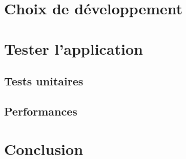 \documentclass[11pt]{article} %
\begin{document}
\section{Choix de développement}

\section{Tester l'application}
\subsection{Tests unitaires}
\subsection{Performances}

\section{Conclusion}
\end{document}

